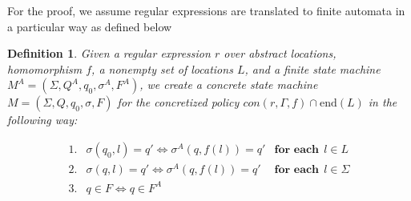 \documentclass[twocolumn, openany]{sig-alternate-10pt}
\newcommand{\EndR}{\ensuremath{\mathrm{end}}}
\newtheorem{defn}{Definition}
\newtheorem{lem}[thm]{Lemma}
\begin{document}


%



\vspace{2em}
For the proof, we assume regular expressions are translated to finite automata in a particular way as defined below

\begin{defn}
Given a regular expression $r$ over abstract locations, homomorphism $f$, a nonempty set of locations $L$, and a finite state machine $M^A = (\Sigma,Q^A,q_0,\sigma^A,F^A)$, we create a concrete state machine $M = (\Sigma, Q, q_0, \sigma, F)$ for the concretized policy $con(r,\Gamma, f) \cap \EndR(L)$ in the following way: 

    \[ \begin{array}{lll}
      1. & \sigma(q_0,l) = q' \iff \sigma^A(q,f(l)) = q' & \textbf{for each}~~ l \in L \\
      2. & \sigma(q,l) = q' \iff \sigma^A(q,f(l)) = q' & \textbf{for each}~~ l \in \Sigma \\
      3. & q \in F \iff q \in F^A & \\
    \end{array} \]
\end{defn}
\end{document}
